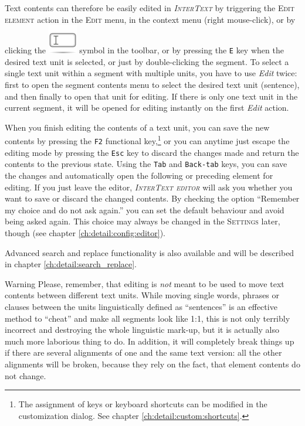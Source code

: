 \documentclass[a4paper,10pt,oneside]{book}
\newcommand{\IT}{\textit{\textsc{InterText}}\xspace}
\newcommand{\ITeditor}{\textit{\textsc{InterText editor}}\xspace}
\newcommand{\keys}[1]{\texttt{#1}}
\newcommand{\menu}[1]{\textsc{#1}}
\begin{document}
Text contents can therefore be easily edited in \IT by triggering the \menu{Edit element} action in the \menu{Edit} menu, in the context menu (right mouse-click), or by clicking the \includegraphics[height=2ex]{../images/48/edit-rename.png} symbol in the toolbar, or by pressing the \keys{E} key when the desired text unit is selected, or just by double-clicking the segment. To select a single text unit within a segment with multiple units, you have to use \emph{Edit} twice: first to open the segment contents menu to select the desired text unit (sentence), and then finally to open that unit for editing. If there is only one text unit in the current segment, it will be opened for editing instantly on the first \emph{Edit} action.

When you finish editing the contents of a text unit, you can save the new contents by pressing the \keys{F2} functional key,\footnote{The assignment of keys or keyboard shortcuts can be modified in the customization dialog. See chapter \ref{ch:detail:custom:shortcuts}.} or you can anytime just escape the editing mode by pressing the \keys{Esc} key to discard the changes made and return the contents to the previous state. Using the \keys{Tab} and \keys{Back-tab} keys, you can save the changes and automatically open the following or preceding element for editing. If you just leave the editor, \ITeditor will ask you whether you want to save or discard the changed contents. By checking the option ``Remember my choice and do not ask again.'' you can set the default behaviour and avoid being asked again. This choice may always be changed in the \menu{Settings} later, though (see chapter \ref{ch:detail:config:editor}).

Advanced search and replace functionality is also available and will be described in chapter \ref{ch:detail:search_replace}.

\medskip
\begin{bclogo}[couleur = blue!30, arrondi = 0.1, logo = \bcattention,
ombre = true , epOmbre = 0.125, couleurOmbre = black!30, blur, epBord = 0.3, marge = 5]{Warning}\small
Please, remember, that editing is \emph{not} meant to be used to move text contents between different text units. While moving single words, phrases or clauses between the units linguistically defined as ``sentences'' is an effective method to ``cheat'' and make all segments look like 1:1, this is not only terribly incorrect and destroying the whole linguistic mark-up, but it is actually also much more laborious thing to do. In addition, it will completely break things up if there are several alignments of one and the same text version: all the other alignments will be broken, because they rely on the fact, that element contents do not change.
\end{bclogo}
\end{document}
